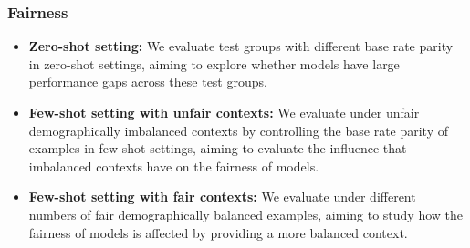 \subsubsection*{Fairness}
\begin{itemize}
    \item  \textbf{Zero-shot setting:} We evaluate test groups with different base rate parity in zero-shot settings, aiming to explore whether models have large performance gaps across these test groups.
    \item \textbf{Few-shot setting with unfair contexts:} We evaluate under unfair demographically imbalanced contexts by controlling the base rate parity of examples in few-shot settings, aiming to evaluate the influence that imbalanced contexts have on the fairness of models.
    \item \textbf{Few-shot setting with fair contexts:} We evaluate under different numbers of fair demographically balanced examples, aiming to study how the fairness of models is affected by providing a more balanced context.
\end{itemize}